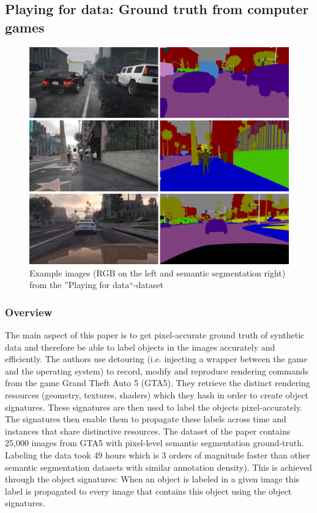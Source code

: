 \documentclass[a4paper,cleardoubleempty,BCOR1cm]{scrbook}
\begin{document}
\newpage

\subsection{Playing for data: Ground truth from computer games}
\cite{Richter_2016_ECCV}

\begin{figure}[h]
	\centering
	\includegraphics[width=\textwidth]{images/P4D.png}
	\caption{Example images (RGB on the left and semantic segmentation right) from the ''Playing for data``-dataset}
	\label{P4D}
\end{figure}

\subsubsection{Overview}
The main aspect of this paper is to get pixel-accurate ground truth of synthetic data and therefore be able to label objects in the images accurately and efficiently.
The authors use detouring (i.e. injecting a wrapper between the game and the operating system) to record, modify and reproduce rendering commands from the game Grand Theft Auto 5 (GTA5). They retrieve the distinct rendering resources (geometry, textures, shaders) which they hash in order to create object signatures. These signatures are then used to label the objects pixel-accurately. The signatures then enable them to propagate these labels across time and instances that share distinctive resources. The dataset of the paper contains 25,000 images from GTA5 with pixel-level semantic segmentation ground-truth. Labeling the data took 49 hours  which is 3 orders of magnitude faster than other semantic segmentation datasets with similar annotation density). This is achieved through the object signatures: When an object is labeled in a given image this label is propagated to every image that contains this object using the object signatures. 
\end{document}
